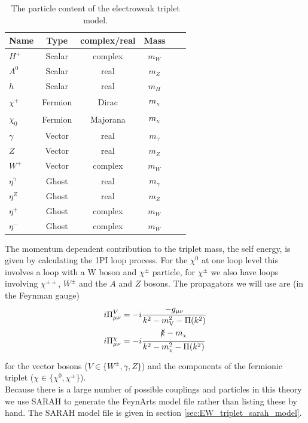 \documentclass[11pt]{article}
\newcommand{\mychi}{\raisebox{0pt}[1ex][1ex]{\tiny$\chi$}}
\def\mc{m_{\mychi}}
\newcommand{\sarah}{\textsf{SARAH} }
\newcommand{\feynarts}{\textsf{FeynArts} }
\begin{document}
\begin{table}[h]
 \caption{The particle content of the electroweak triplet model.}\label{tab:particles}
 \vspace{0.3cm}
 \centering 
\begin{tabular}{lccccc}
\hline 
Name & Type & complex/real & Mass  \\ 
\hline \hline 
\(H^+\) & Scalar &complex& $m_W$\\
 \(A^0\) & Scalar &real & $m_Z$\\
 \(h\) & Scalar &real & $m_H$\\
 \hline 
\(\chi^{+}\) & Fermion &Dirac & $\mc$\\
 \(\chi_0\) & Fermion &Majorana & $\mc$\\
 \hline 
\(\gamma\) & Vector &real & $m_{\gamma}$\\
 \(Z\) & Vector &real & $m_Z$\\
 \(W^+\) & Vector &complex & $m_W$\\
 \(\eta^{\gamma}\) & Ghost &real & $m_{\gamma}$\\
 \(\eta^Z\) & Ghost &real & $m_Z$\\
 \(\eta^+\) & Ghost &complex & $m_W$\\
 \(\eta^-\) & Ghost &complex & $m_W$\\
 \hline
\end{tabular}
 \end{table}
The momentum dependent contribution to the triplet mass, the self energy, is given by calculating the 1PI loop process.  For the $
\chi^0$ at one loop level this involves a loop with a W boson and $\chi^{\pm}$ particle, for $\chi^{\pm}$ we also have loops involving $
\chi^{\pm\pm}$, $W^{\pm}$ and the $A$ and $Z$ bosons.  The propagators we will use are (in the Feynman gauge)
\begin{align}
i\Pi^{V}_{\mu\nu}&=-i\frac{-g_{\mu\nu}}{k^2-m_{\text{V}}^2- \Pi(k^2)}\label{eqn:gauge_boson_propagator}\\ 
i\Pi^{\chi}_{\mu\nu}&=-i\frac{\slashed{k}-\mc}{k^2-\mc^2- \Pi(k^2)}
\end{align}
for the vector bosons ($V\in\{W^{\pm},\gamma,Z\}$) and the components of the fermionic triplet ($\chi\in\{\chi^0,\chi^{\pm}\}$).\\

Because there is a large number of possible couplings and particles in this theory we use \sarah \cite{Staub2014} to generate the \feynarts \cite{Hahn2000} model file rather than listing these by hand.  The \sarah model file is given in section \ref{sec:EW_triplet_sarah_model}.\\
\end{document}

